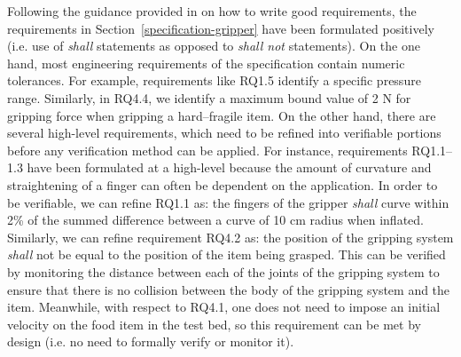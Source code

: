 \documentclass[lettersize,journal]{IEEEtran}
\begin{document}
Following the guidance provided in \cite{NASA2007} on how to write good requirements, the requirements in Section~\ref{specification-gripper} have been formulated positively (i.e. use of \emph{shall} statements as opposed to \emph{shall not} statements). 
On the one hand, most engineering requirements of the specification contain numeric tolerances. 
For example, requirements like RQ1.5 identify a specific pressure range. 
Similarly, in RQ4.4, we identify a maximum bound value of 2 N for gripping force when gripping a hard–fragile item. 
On the other hand, there are several high-level requirements, which need to be refined into verifiable portions before any verification method can be applied. 
For instance, requirements RQ1.1--1.3 have been formulated at a high-level because the amount of curvature and straightening of a finger can often be dependent on the application. 
In order to be verifiable, we can refine RQ1.1 as: the fingers of the gripper \emph{shall} curve within 2\% of the summed difference between a curve of 10 cm radius when inflated. 
Similarly, we can refine requirement RQ4.2 as: the position of the gripping system \emph{shall} not be equal to the position of the item being grasped. 
This can be verified by monitoring the distance between each of the joints of the gripping system to ensure that there is no collision between the body of the gripping system and the item. 
Meanwhile, with respect to RQ4.1, one does not need to impose an initial velocity on the food item in the test bed, so this requirement can be met by design (i.e. no need to formally verify or monitor it).
\end{document}
